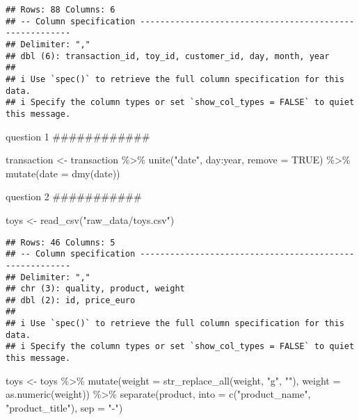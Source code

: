 \documentclass[
]{article}
\newenvironment{Shaded}{\begin{snugshade}}{\end{snugshade}}
\newcommand{\AttributeTok}[1]{\textcolor[rgb]{0.77,0.63,0.00}{#1}}
\newcommand{\ConstantTok}[1]{\textcolor[rgb]{0.00,0.00,0.00}{#1}}
\newcommand{\FunctionTok}[1]{\textcolor[rgb]{0.00,0.00,0.00}{#1}}
\newcommand{\NormalTok}[1]{#1}
\newcommand{\OtherTok}[1]{\textcolor[rgb]{0.56,0.35,0.01}{#1}}
\newcommand{\SpecialCharTok}[1]{\textcolor[rgb]{0.00,0.00,0.00}{#1}}
\newcommand{\StringTok}[1]{\textcolor[rgb]{0.31,0.60,0.02}{#1}}
\begin{document}
\begin{verbatim}
## Rows: 88 Columns: 6
## -- Column specification --------------------------------------------------------
## Delimiter: ","
## dbl (6): transaction_id, toy_id, customer_id, day, month, year
## 
## i Use `spec()` to retrieve the full column specification for this data.
## i Specify the column types or set `show_col_types = FALSE` to quiet this message.
\end{verbatim}

question 1 \#\#\#\#\#\#\#\#\#\#\#\#

\begin{Shaded}
\begin{Highlighting}[]
\NormalTok{transaction }\OtherTok{\textless{}{-}}\NormalTok{ transaction }\SpecialCharTok{\%\textgreater{}\%} 
  \FunctionTok{unite}\NormalTok{(}\StringTok{"date"}\NormalTok{, day}\SpecialCharTok{:}\NormalTok{year, }\AttributeTok{remove =} \ConstantTok{TRUE}\NormalTok{) }\SpecialCharTok{\%\textgreater{}\%} 
  \FunctionTok{mutate}\NormalTok{(}\AttributeTok{date =} \FunctionTok{dmy}\NormalTok{(date))}
\end{Highlighting}
\end{Shaded}

question 2 \#\#\#\#\#\#\#\#\#\#\#

\begin{Shaded}
\begin{Highlighting}[]
\NormalTok{toys }\OtherTok{\textless{}{-}} \FunctionTok{read\_csv}\NormalTok{(}\StringTok{"raw\_data/toys.csv"}\NormalTok{)}
\end{Highlighting}
\end{Shaded}

\begin{verbatim}
## Rows: 46 Columns: 5
## -- Column specification --------------------------------------------------------
## Delimiter: ","
## chr (3): quality, product, weight
## dbl (2): id, price_euro
## 
## i Use `spec()` to retrieve the full column specification for this data.
## i Specify the column types or set `show_col_types = FALSE` to quiet this message.
\end{verbatim}

\begin{Shaded}
\begin{Highlighting}[]
\NormalTok{toys }\OtherTok{\textless{}{-}}\NormalTok{ toys }\SpecialCharTok{\%\textgreater{}\%} 
  \FunctionTok{mutate}\NormalTok{(}\AttributeTok{weight =} \FunctionTok{str\_replace\_all}\NormalTok{(weight, }\StringTok{"g"}\NormalTok{, }\StringTok{""}\NormalTok{),}
         \AttributeTok{weight =} \FunctionTok{as.numeric}\NormalTok{(weight)) }\SpecialCharTok{\%\textgreater{}\%} 
  \FunctionTok{separate}\NormalTok{(product, }\AttributeTok{into =} \FunctionTok{c}\NormalTok{(}\StringTok{"product\_name"}\NormalTok{, }\StringTok{"product\_title"}\NormalTok{), }\AttributeTok{sep =} \StringTok{"{-}"}\NormalTok{)}
\end{Highlighting}
\end{Shaded}
\end{document}
